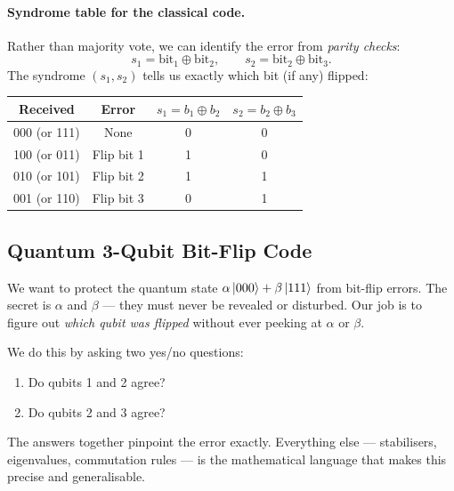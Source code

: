 \documentclass[11pt, a4paper]{article}
\theoremstyle{definition}
\theoremstyle{plain}
\theoremstyle{remark}
\begin{document}
\paragraph{Syndrome table for the classical code.}
Rather than majority vote, we can identify the error from \emph{parity
checks}:
\[
  s_1 = \text{bit}_1 \oplus \text{bit}_2, \qquad
  s_2 = \text{bit}_2 \oplus \text{bit}_3.
\]
The syndrome $(s_1, s_2)$ tells us exactly which bit (if any) flipped:

\begin{center}
\renewcommand{\arraystretch}{1.3}
\begin{tabular}{@{} c c c c @{}}
  \toprule
  \textbf{Received} & \textbf{Error} & \textbf{$s_1 = b_1\oplus b_2$} &
    \textbf{$s_2 = b_2\oplus b_3$}\\
  \midrule
  000 (or 111) & None  & 0 & 0\\
  100 (or 011) & Flip bit 1 & 1 & 0\\
  010 (or 101) & Flip bit 2 & 1 & 1\\
  001 (or 110) & Flip bit 3 & 0 & 1\\
  \bottomrule
\end{tabular}
\end{center}




\subsection{Quantum 3-Qubit Bit-Flip Code}
\label{sec:3qubit-bitflip}

\begin{intuition}
We want to protect the quantum state
$\alpha\ket{000}+\beta\ket{111}$
from bit-flip errors.
The secret is $\alpha$ and $\beta$ --- they must never be revealed or
disturbed.
Our job is to figure out \emph{which qubit was flipped} without ever
peeking at $\alpha$ or $\beta$.

We do this by asking two yes/no questions:
\begin{enumerate}
  \item Do qubits 1 and 2 agree?
  \item Do qubits 2 and 3 agree?
\end{enumerate}
The answers together pinpoint the error exactly.
Everything else --- stabilisers, eigenvalues, commutation rules --- is the
mathematical language that makes this precise and generalisable.
\end{intuition}
\end{document}
